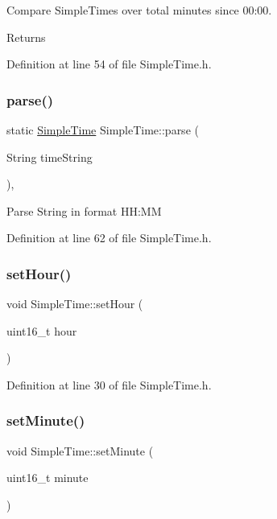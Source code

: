 Compare Simple\+Times over total minutes since 00\+:00. \begin{DoxyReturn}{Returns}

\end{DoxyReturn}


Definition at line 54 of file Simple\+Time.\+h.

\mbox{\label{class_simple_time_ad2d133f20de1ac63166308bc77906dfb}} 
\subsubsection{\texorpdfstring{parse()}{parse()}}
{\footnotesize\ttfamily static \mbox{\hyperlink{class_simple_time}{Simple\+Time}} Simple\+Time\+::parse (\begin{DoxyParamCaption}\item[{String}]{time\+String }\end{DoxyParamCaption})\hspace{0.3cm}{\ttfamily [inline]}, {\ttfamily [static]}}

Parse String in format HH\+:MM 

Definition at line 62 of file Simple\+Time.\+h.

\mbox{\label{class_simple_time_aba0375d3ee93859fdb37b15532c149a4}} 
\subsubsection{\texorpdfstring{setHour()}{setHour()}}
{\footnotesize\ttfamily void Simple\+Time\+::set\+Hour (\begin{DoxyParamCaption}\item[{uint16\+\_\+t}]{hour }\end{DoxyParamCaption})\hspace{0.3cm}{\ttfamily [inline]}}



Definition at line 30 of file Simple\+Time.\+h.

\mbox{\label{class_simple_time_ac5b1e04be8f134f378950dcb6f22f966}} 
\subsubsection{\texorpdfstring{setMinute()}{setMinute()}}
{\footnotesize\ttfamily void Simple\+Time\+::set\+Minute (\begin{DoxyParamCaption}\item[{uint16\+\_\+t}]{minute }\end{DoxyParamCaption})\hspace{0.3cm}{\ttfamily [inline]}}



